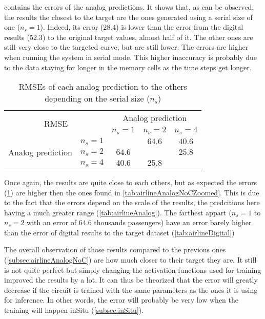  contains the errors of the analog predictions. It shows that, as can be observed, the results the closest to the target are the ones generated using a serial size of one ($n_s=1$). Indeed, its error ($28.4$) is lower than the error from the digital results ($52.3$) to the original target values, almost half of it. The other ones are still very close to the targeted curve, but are still lower. The errors are higher when running the system in serial mode. This higher inaccuracy is probably due to the data staying for longer in the memory cells as the time steps get longer.

\begin{table}[H]
  \centering
  \begin{tabular}{|c|c|c|c|c|}
    \hline
    \multicolumn{2}{|c}{\multirow{2}{*}{\ac{RMSE}}} & \multicolumn{3}{|c|}{Analog prediction}\\
    \cline{3-5}
    \multicolumn{2}{|c}{} & \multicolumn{1}{|c|}{$n_s=1$} & $n_s=2$ & $n_s=4$ \\
    \hline
    \multirow{3}{*}{Analog prediction} & $n_s=1$ &\cellcolor[HTML]{202020} & $64.6$ & $40.6$\\
    \cline{2-5}
    & $n_s=2$  & $64.6$ & \cellcolor[HTML]{202020} & $25.8$\\
    \cline{2-5}
    & $n_s=4$ & $40.6$ & $25.8$ & \cellcolor[HTML]{202020}\\
    \hline
  \end{tabular}
  \caption{\acp{RMSE} of each analog prediction to the others depending on the serial size ($n_s$)}
  \label{tab:airlineAnalogError}
\end{table}

Once again, the results are quite close to each others, but as expected the errors (\cref{tab:airlineAnalogError}) are higher then the ones found in \cref{tab:airlineAnalogNoCZoomed}. This is due to the fact that the errors depend on the scale of the results, the predcitions here having a much greater range (\cref{tab:airlineAnalog}). The farthest appart ($n_s=1$ to $n_s=2$ with an error of $64.6$ thousands passengers) have an error barely higher than the error of digital results to the target dataset (\cref{tab:airlineDigital})

The overall observation of those results compared to the previous ones (\cref{subsec:airlineAnalogNoC}) are how much closer to their target they are. It still is not quite perfect but simply changing the activation functions used for training improved the results by a lot. It can thus be theorized that the error will greatly decrease if the circuit is trained with the same parameters as the ones it is using for inference. In other words, the error will probably be very low when the training will happen inSitu (\cref{subsec:inSitu}).

